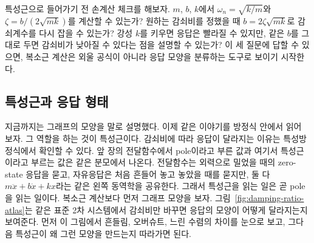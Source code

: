 특성근으로 들어가기 전 손계산 체크를 해보자.
$m$, $b$, $k$에서 $\omega_n=\sqrt{k/m}$와 $\zeta=b/(2\sqrt{mk})$를 계산할 수 있는가?
원하는 감쇠비를 정했을 때 $b=2\zeta\sqrt{mk}$로 감쇠계수를 다시 잡을 수 있는가?
강성 $k$를 키우면 응답은 빨라질 수 있지만, 같은 $b$를 그대로 두면 감쇠비가 낮아질 수 있다는 점을 설명할 수 있는가?
이 세 질문에 답할 수 있으면, 복소근 계산은 외울 공식이 아니라 응답 모양을 분류하는 도구로 보이기 시작한다.

\subsection{특성근과 응답 형태}

지금까지는 그래프의 모양을 말로 설명했다.
이제 같은 이야기를 방정식 안에서 읽어 보자.
그 역할을 하는 것이 특성근이다.
감쇠비에 따라 응답이 달라지는 이유는 특성방정식에서 확인할 수 있다.
앞 장의 전달함수에서 pole이라고 부른 값과 여기서 특성근이라고 부르는 값은 같은 분모에서 나온다.
전달함수는 외력으로 밀었을 때의 zero-state 응답을 묻고, 자유응답은 처음 흔들어 놓고 놓았을 때를 묻지만, 둘 다 $m\ddot{x}+b\dot{x}+kx$라는 같은 왼쪽 동역학을 공유한다.
그래서 특성근을 읽는 일은 곧 pole을 읽는 일이다.
복소근 계산보다 먼저 그래프 모양을 보자.
그림~\ref{fig:damping-ratio-atlas}는 같은 표준 2차 시스템에서 감쇠비만 바꾸면 응답의 모양이 어떻게 달라지는지 보여준다.
먼저 이 그림에서 흔들림, 오버슈트, 느린 수렴의 차이를 눈으로 보고, 그다음 특성근이 왜 그런 모양을 만드는지 따라가면 된다.



